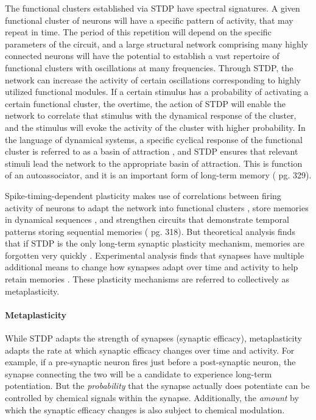 \documentclass[twocolumn]{article}
\begin{document}
The functional clusters established via STDP have spectral signatures. A given functional cluster of neurons will have a specific pattern of activity, that may repeat in time. The period of this repetition will depend on the specific parameters of the circuit, and a large structural network comprising many highly connected neurons will have the potential to establish a vast repertoire of functional clusters with oscillations at many frequencies. Through STDP, the network can increase the activity of certain oscillations corresponding to highly utilized functional modules. If a certain stimulus has a probability of activating a certain functional cluster, the overtime, the action of STDP will enable the network to correlate that stimulus with the dynamical response of the cluster, and the stimulus will evoke the activity of the cluster with higher probability. In the language of dynamical systems, a specific cyclical response of the functional cluster is referred to as a basin of attraction \cite{iz2007,st2015}, and STDP ensures that relevant stimuli lead the network to the appropriate basin of attraction. This is function of an autoassociator, and it is an important form of long-term memory (\cite{bu2006} pg. 329).

Spike-timing-dependent plasticity makes use of correlations between firing activity of neurons to adapt the network into functional clusters \cite{shki2006}, store memories in dynamical sequences \cite{haah2015}, and strengthen circuits that demonstrate temporal patterns storing sequential memories (\cite{bu2006} pg. 318). But theoretical analysis finds that if STDP is the only long-term synaptic plasticity mechanism, memories are forgotten very quickly \cite{fuab2007}. Experimental analysis finds that synapses have multiple additional means to change how synapses adapt over time and activity to help retain memories \cite{ab2008}. These plasticity mechanisms are referred to collectively as metaplasticity.

\paragraph{Metaplasticity}
While STDP adapts the strength of synapses (synaptic efficacy), metaplasticity adapts the rate at which synaptic efficacy changes over time and activity. For example, if a pre-synaptic neuron fires just before a post-synaptic neuron, the synapse connecting the two will be a candidate to experience long-term potentiation. But the \textit{probability} that the synapse actually does potentiate can be controlled by chemical signals within the synapse. Additionally, the \textit{amount} by which the synaptic efficacy changes is also subject to chemical modulation. 
\end{document}
